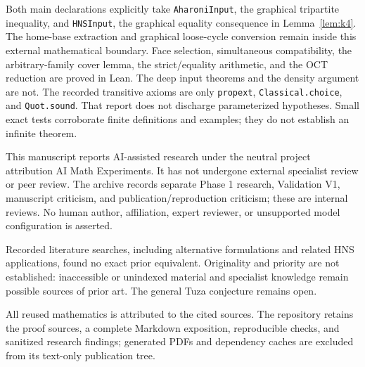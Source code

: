 \documentclass[11pt]{article}
\begin{document}
Both main declarations explicitly take \texttt{AharoniInput}, the
graphical tripartite inequality, and \texttt{HNSInput}, the graphical
equality consequence in Lemma~\ref{lem:k4}. The home-base extraction and
graphical loose-cycle conversion remain inside this external mathematical
boundary. Face selection, simultaneous compatibility, the arbitrary-family
cover lemma, the strict/equality arithmetic, and the OCT reduction are
proved in Lean. The deep input theorems and the density argument are not.
The recorded transitive axioms are only \texttt{propext},
\texttt{Classical.choice}, and \texttt{Quot.sound}. That report does not
discharge parameterized hypotheses. Small exact tests corroborate finite
definitions and examples; they do not establish an infinite theorem.

This manuscript reports AI-assisted research under the neutral project
attribution AI Math Experiments. It has not undergone external specialist
review or peer review. The archive records separate Phase 1 research,
Validation V1, manuscript criticism, and publication/reproduction criticism;
these are internal reviews. No human author, affiliation, expert reviewer,
or unsupported model configuration is asserted.

Recorded literature searches, including alternative formulations and related
HNS applications, found no exact prior equivalent. Originality and priority
are not established: inaccessible or unindexed material and specialist
knowledge remain possible sources of prior art. The general Tuza conjecture
remains open.

All reused mathematics is attributed to the cited sources. The repository retains
the proof sources, a complete Markdown exposition, reproducible checks,
and sanitized research findings; generated PDFs and dependency caches
are excluded from its text-only publication tree.



\end{document}
